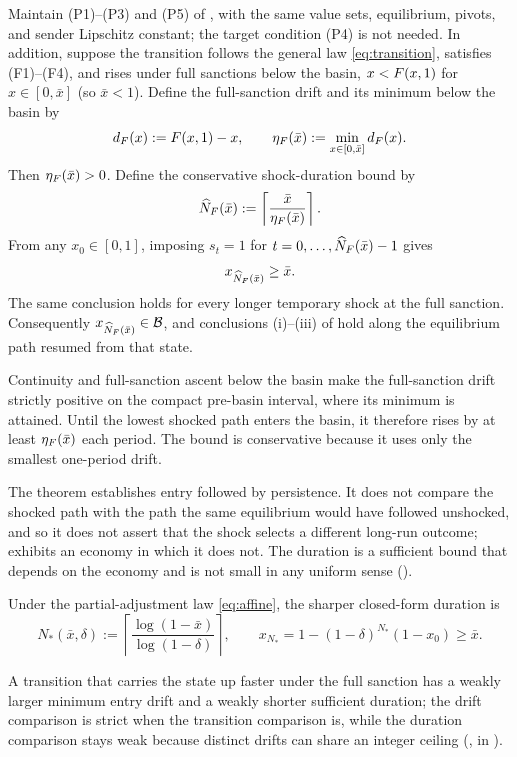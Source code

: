 \begin{theorem}
\label{thm:shock}
Maintain \textup{(P1)--(P3)} and \textup{(P5)} of ,
with the same value sets, equilibrium, pivots, and sender Lipschitz constant;
the target condition \textup{(P4)} is not needed. In
addition, suppose the transition follows the general law
\eqref{eq:transition}, satisfies \textup{(F1)--(F4)}, and rises under full
sanctions below the basin, $x<F(x,1)$ for $x\in[0,\bar x]$ (so $\bar x<1$). Define the full-sanction drift and its minimum below the
basin by
\[
d_{F}(x):=F(x,1)-x,
\qquad
\eta_{F}(\bar x):=\min_{x\in[0,\bar x]}d_{F}(x).
\]
Then $\eta_{F}(\bar x)>0$. Define the conservative shock-duration
bound by
\[
\widehat N_{F}(\bar x)
:=\left\lceil\frac{\bar x}{\eta_{F}(\bar x)}\right\rceil.
\]
From any $x_0\in[0,1]$, imposing $s_t=1$ for
$t=0,\ldots,\widehat N_{F}(\bar x)-1$ gives
\[
x_{\widehat N_{F}(\bar x)}\ge\bar x.
\]
The same conclusion holds for every longer temporary shock at the full sanction.
Consequently $x_{\widehat N_{F}(\bar x)}\in\mathcal{B}$, and conclusions
(i)--(iii) of  hold along the equilibrium path
resumed from that state.
\end{theorem}

Continuity and full-sanction ascent below the basin make the full-sanction
drift strictly positive on the compact pre-basin interval, where its minimum
is attained. Until the lowest shocked
path enters the basin, it therefore rises by at least
$\eta_{F}(\bar x)$ each period. The bound is conservative because it
uses only the smallest one-period drift.

The theorem establishes entry followed by persistence. It does not compare
the shocked path with the path the same equilibrium would have followed
unshocked, and so it does not assert that the shock selects a different
long-run outcome;  exhibits an economy
in which it does not. The duration is a sufficient bound that depends on the
economy and is not small in any uniform sense ().

Under the partial-adjustment law \eqref{eq:affine}, the sharper closed-form duration is
\[
N_*(\bar x,\delta)
:=\left\lceil\frac{\log(1-\bar x)}{\log(1-\delta)}\right\rceil,
\qquad
x_{N_*}=1-(1-\delta)^{N_*}(1-x_0)\ge\bar x.
\]

A transition that carries the state up faster under the full sanction has
a weakly larger minimum entry drift and a weakly shorter sufficient
duration; the drift comparison is strict when the transition comparison is,
while the duration comparison stays weak because distinct drifts can share an
integer ceiling (, in ).

